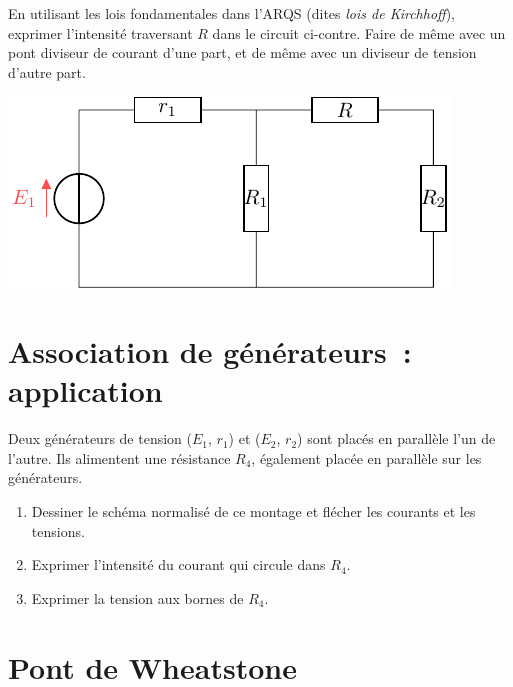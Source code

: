 \documentclass[../../main/main.tex]{subfiles}
\begin{document}
\begin{minipage}{0.45\linewidth} En utilisant les lois fondamentales dans l'ARQS
	(dites \textit{lois de Kirchhoff}), exprimer l'intensité traversant $R$ dans
	le circuit ci-contre. Faire de même avec un pont diviseur de courant d'une
	part, et de même avec un diviseur de tension d'autre part.
\end{minipage}
\begin{minipage}{0.45\linewidth}
	\begin{center}
		\includegraphics[width=\linewidth]{calc_intens-plain}
	\end{center}
\end{minipage}

\section{Association de générateurs~: application}

Deux générateurs de tension ($E_1$, $r_1$) et ($E_2$, $r_2$) sont placés en
parallèle l'un de l'autre. Ils alimentent une résistance $R_4$, également placée
en parallèle sur les générateurs.
\begin{enumerate}
	\item Dessiner le schéma normalisé de ce montage et flécher les courants et
	      les tensions.
	\item Exprimer l'intensité du courant qui circule dans $R_4$.
	\item Exprimer la tension aux bornes de $R_4$.
\end{enumerate}

\section{Pont de Wheatstone}
\end{document}

